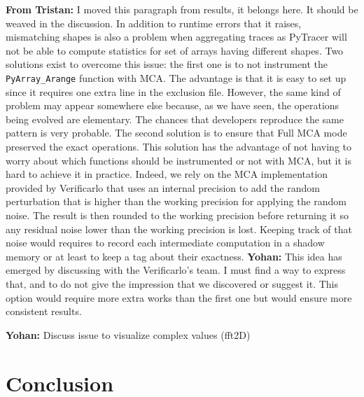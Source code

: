 \documentclass[11pt]{article}
\newcommand{\tristan}[1]{\color{orange}\textbf{From Tristan:} #1\color{black}\xspace}
\newcommand{\Yohan}[1]{\color{green!75!black}\textbf{Yohan:} #1\color{black}\xspace}
\newcommand{\pytracer}[0]{PyTracer\xspace}
\begin{document}
\tristan{I moved this paragraph from results, it belongs here. It should be weaved in the discussion.}
In addition to runtime errors that it raises, mismatching shapes is also a problem when aggregating
traces as \pytracer will not be able to compute statistics for set of arrays having different shapes.
Two solutions exist to overcome this issue: the first one is to not instrument the \texttt{PyArray\_Arange}
function with MCA. The advantage is that it is easy to set up since it requires one extra line in the exclusion file.
However, the same kind of problem may appear somewhere else
because, as we have seen, the operations being evolved are elementary. The chances that developers reproduce
the same pattern is very probable. The second solution is to ensure that Full MCA mode preserved the exact operations.
This solution has the advantage of not having to worry about which functions should be instrumented or not with MCA,
but it is hard to achieve it in practice. Indeed, we rely on the MCA implementation provided by Verificarlo that 
uses an internal precision to add the random perturbation that is higher 
than the working precision for applying the random noise. The result is then rounded to the working precision before returning it so
any residual noise lower than the working precision is lost. 
Keeping track of that noise would requires to record each intermediate computation in a shadow memory 
or at least to keep a tag about their exactness.
\Yohan{This idea has emerged by discussing with the Verificarlo's team. 
I must find a way to express that, and to do not give the impression that we discovered or suggest it.}
This option would require more extra works than the first one but would ensure more consistent results.


\Yohan{Discuss issue to visualize complex values (fft2D)}

\section{Conclusion}
\end{document}
